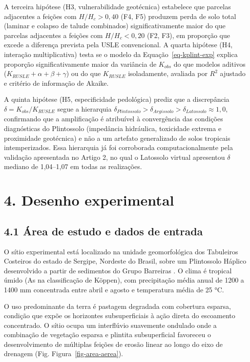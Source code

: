 \documentclass[
  brazilian,
  authoryear,
  preprint]{elsarticle}
\begin{document}
A terceira hipótese (H3, vulnerabilidade geotécnica) estabelece que
parcelas adjacentes a feições com \(H/H_c > 0{,}40\) (F4, F5) produzem
perda de solo total (laminar e colapso de talude combinados)
significativamente maior do que parcelas adjacentes a feições com
\(H/H_c < 0{,}20\) (F2, F3), em proporção que excede a diferença
prevista pela USLE convencional. A quarta hipótese (H4, interação
multiplicativa) testa se o modelo da Equação~\ref{eq-kplint-exp} explica
proporção significativamente maior da variância de \(K_{obs}\) do que
modelos aditivos (\(K_{RUSLE} + \alpha + \beta + \gamma\)) ou do que
\(K_{RUSLE}\) isoladamente, avaliada por \(R^2\) ajustado e critério de
informação de Akaike.

A quinta hipótese (H5, especificidade pedológica) prediz que a
discrepância \(\delta = K_{obs}/K_{RUSLE}\) segue a hierarquia
\(\delta_{Plintossolo} > \delta_{Argissolo} > \delta_{Latossolo} \approx 1{,}0\),
confirmando que a amplificação é atribuível à convergência das condições
diagnósticas do Plintossolo (impedância hidráulica, toxicidade extrema e
proximidade geotécnica) e não a um artefato generalizado de solos
tropicais intemperizados. Essa hierarquia já foi corroborada
computacionalmente pela validação apresentada no Artigo 2, no qual o
Latossolo virtual apresentou \(\delta\) mediano de 1,04--1,07 em todas
as realizações.

\section{4. Desenho experimental}\label{desenho-experimental}

\subsection{4.1 Área de estudo e dados de
entrada}\label{uxe1rea-de-estudo-e-dados-de-entrada}

O sítio experimental está localizado na unidade geomorfológica dos
Tabuleiros Costeiros do estado de Sergipe, Nordeste do Brasil, sobre um
Plintossolo Háplico desenvolvido a partir de sedimentos do Grupo
Barreiras \citep{nascimento_pedrotti_2004}. O clima é tropical úmido (As
na classificação de Köppen), com precipitação média anual de 1200 a 1400
mm concentrada entre abril e agosto e temperatura média de 25 °C.

O uso predominante da terra é pastagem degradada com cobertura esparsa,
condição que expõe os horizontes subsuperficiais à ação direta do
escoamento concentrado. O sítio ocupa um interflúvio suavemente ondulado
onde a combinação de vegetação esparsa e plintita subsuperficial
favoreceu o desenvolvimento de múltiplas feições de erosão linear ao
longo do eixo de drenagem (Fig. Figura~\ref{fig-area-aerea}).
\end{document}
